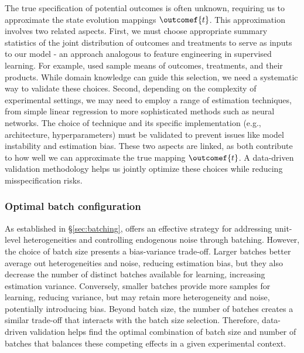 The true specification of potential outcomes is often unknown, requiring us to approximate the state evolution mappings $\outcomef{t}$. This approximation involves two related aspects. First, we must choose appropriate summary statistics of the joint distribution of outcomes and treatments to serve as inputs to our model - an approach analogous to feature engineering in supervised learning. For example, \cite{shirani2024causal} used sample means of outcomes, treatments, and their products. While domain knowledge can guide this selection, we need a systematic way to validate these choices.
Second, depending on the complexity of experimental settings, we may need to employ a range of estimation techniques, from simple linear regression to more sophisticated methods such as neural networks. The choice of technique and its specific implementation (e.g., architecture, hyperparameters) must be validated to prevent issues like model instability and estimation bias. These two aspects are linked, as both contribute to how well we can approximate the true mapping $\outcomef{t}$. A data-driven validation methodology helps us jointly optimize these choices while reducing misspecification risks.


\subsubsection*{Optimal batch configuration}
% 
As established in \S\ref{sec:batching}, \batchingAcronym{} offers an effective strategy for addressing unit-level heterogeneities and controlling endogenous noise through batching. However, the choice of batch size presents a bias-variance trade-off. Larger batches better average out heterogeneities and noise, reducing estimation bias, but they also decrease the number of distinct batches available for learning, increasing estimation variance. Conversely, smaller batches provide more samples for learning, reducing variance, but may retain more heterogeneity and noise, potentially introducing bias.
Beyond batch size, the number of batches creates a similar trade-off that interacts with the batch size selection. Therefore, data-driven validation helps find the optimal combination of batch size and number of batches that balances these competing effects in a given experimental context.




